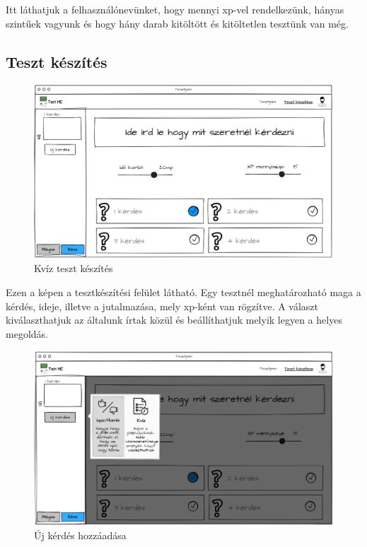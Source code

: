 Itt láthatjuk  a felhasználónevünket, hogy mennyi xp-vel rendelkezünk, hányas szintűek vagyunk és hogy hány darab kitöltött és kitöltetlen tesztünk van még.

\subsection{Teszt készítés}

\begin{figure}[H]
    \centering
    \includegraphics[width=\linewidth]{images/make_test_wireframe.png}
    \caption{Kvíz teszt készítés}
    \label{fig:new_quiz_question}
\end{figure}

Ezen a képen  a tesztkészítési felület látható. Egy tesztnél meghatározható maga a kérdés, ideje, illetve a jutalmazása, mely xp-ként van rögzítve. A választ kiválaszthatjuk az általunk írtak közül és beállíthatjuk melyik legyen a helyes megoldás.

\begin{figure}[H]
    \centering
    \includegraphics[width=\linewidth]{images/make_test2_wireframe.png}
    \caption{Új kérdés hozzáadása}
    \label{fig:new_question}
\end{figure}

